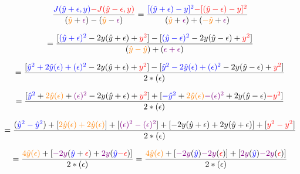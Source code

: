 \documentclass{article}
\begin{document}
\begin{displaymath}
\frac{\textcolor{blue}{J(\hat{y}+\epsilon{}, y)}
\textcolor{red}{-J(\hat{y}-\epsilon{}, y)}}
{(\textcolor{orange}{\hat{y}}+\textcolor{violet}{\epsilon{}})-(
\textcolor{orange}{\hat{y}}-\textcolor{violet}{\epsilon{}})}
=\frac{\textcolor{blue}{[(\hat{y}+\epsilon{})-y]^2}
\textcolor{red}{-[(\hat{y}-\epsilon{})-y]^2}}
{(\textcolor{orange}{\hat{y}}+\textcolor{violet}{\epsilon{}})+(
\textcolor{orange}{-\hat{y}}+\textcolor{violet}{\epsilon{}})}
\end{displaymath}

\begin{displaymath}
=\frac{[\textcolor{blue}{(\hat{y}+\epsilon{})^2}-2y(\hat{y}+\epsilon{})+
\textcolor{red}{y^2}]-[\textcolor{blue}{(\hat{y}-\epsilon{})^2}
-2y(\hat{y}-\epsilon{})+\textcolor{red}{y^2}]}
{(\textcolor{orange}{\hat{y}-\hat{y}})+(\textcolor{violet}{\epsilon{}+\epsilon{}})}
\end{displaymath}

\begin{displaymath}
=\frac{[\textcolor{blue}{\hat{y}^2+2\hat{y}(\epsilon{})+(\epsilon{})^2}
-2y(\hat{y}+\epsilon{})+\textcolor{red}{y^2}]-
[\textcolor{blue}{\hat{y}^2-2\hat{y}(\epsilon{})+(\epsilon{})^2}
-2y(\hat{y}-\epsilon{})+\textcolor{red}{y^2}]}
{2*(\epsilon{})}
\end{displaymath}

\begin{displaymath}
=\frac{[\textcolor{blue}{\hat{y}^2}+\textcolor{orange}{2\hat{y}(\epsilon{})}
+\textcolor{violet}{(\epsilon{})^2}-2y(\hat{y}+\epsilon{})+\textcolor{red}{y^2}]+
[\textcolor{blue}{-\hat{y}^2}+\textcolor{orange}{2\hat{y}(\epsilon{})}
\textcolor{violet}{-(\epsilon{})^2}+2y(\hat{y}-\epsilon{})\textcolor{red}{-y^2}]}
{2*(\epsilon{})}
\end{displaymath}

\begin{displaymath}
=\frac{(\textcolor{blue}{\hat{y}^2-\hat{y}^2})+[
\textcolor{orange}{2\hat{y}(\epsilon{})+2\hat{y}(\epsilon{})}]+[
\textcolor{violet}{(\epsilon{})^2-(\epsilon{})^2}]+[
-2y(\hat{y}+\epsilon{})+2y(\hat{y}+\epsilon{})]+[\textcolor{red}{y^2-y^2}]}
{2*(\epsilon{})}
\end{displaymath}

\begin{displaymath}
=\frac{\textcolor{orange}{4\hat{y}(\epsilon{})}+[\textcolor{violet}{-2y}
(\textcolor{blue}{\hat{y}}+\textcolor{red}{\epsilon{}})+\textcolor{violet}
{2y}(\textcolor{blue}{\hat{y}}\textcolor{red}{-\epsilon{}})]}
{2*(\epsilon{})}
=\frac{\textcolor{orange}{4\hat{y}(\epsilon{})}+[\textcolor{violet}{-2y}
(\textcolor{blue}{\hat{y}})\textcolor{violet}{-2y}
(\textcolor{red}{\epsilon{}})]+[\textcolor{violet}{2y}
(\textcolor{blue}{\hat{y}})\textcolor{violet}{-2y}
(\textcolor{red}{\epsilon{}})]}{2*(\epsilon{})}
\end{displaymath}
\end{document}
